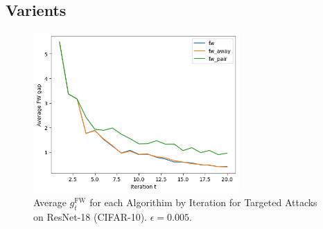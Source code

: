 \documentclass{article}
\begin{document}
\subsection{Varients}

\begin{table}[H]
    \centering
    \caption{Attack Success Rate (ASR) and Average Iterations of Frank-Wolfe Algorithm and Variants for Targeted Adversarial Attacks on Three Datasets with $20$ maximum iterations.}
    \label{tab:algorithm_performance}
\end{table}

\begin{figure}[H]
    \centering
    \includegraphics[width=0.7\textwidth]{plots/mdl_compare_avg_FWgap_by_iter.png}
    \caption{Average $g^\text{FW}_t$ for each Algorithim by Iteration for Targeted Attacks on ResNet-18 (CIFAR-10). $\epsilon = 0.005$.}
    \label{fig:converge-compare}
\end{figure}
\end{document}

